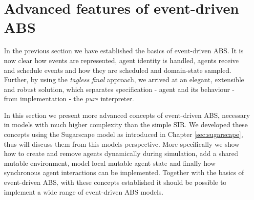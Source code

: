 \section{Advanced features of event-driven ABS}
In the previous section we have established the basics of event-driven ABS. It is now clear how events are represented, agent identity is handled, agents receive and schedule events and how they are scheduled and domain-state sampled. Further, by using the \textit{tagless final} approach, we arrived at an elegant, extensible and robust solution, which separates specification - agent and its behaviour - from implementation - the \textit{pure} interpreter. 

In this section we present more advanced concepts of event-driven ABS, necessary in models with much higher complexity than the simple SIR. We developed these concepts using the Sugarscape model as introduced in Chapter \ref{sec:sugarscape}, thus will discuss them from this models perspective. More specifically we show how to create and remove agents dynamically during simulation, add a shared mutable environment, model local mutable agent state and finally how synchronous agent interactions can be implemented. Together with the basics of event-driven ABS, with these concepts established it should be possible to implement a wide range of event-driven ABS models.









